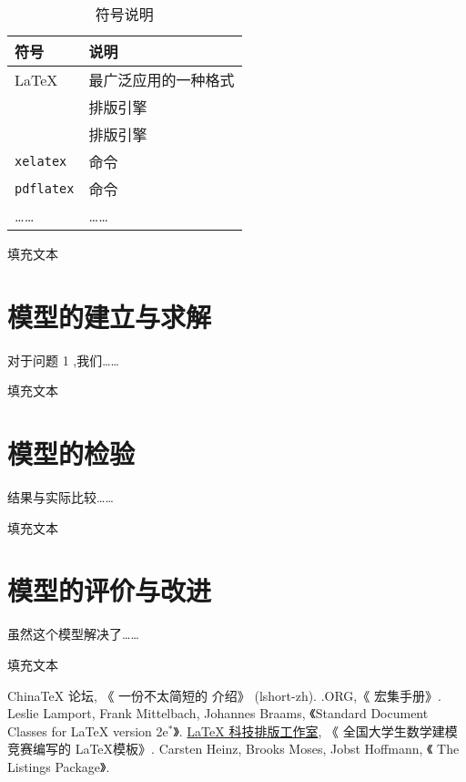 \documentclass[timesfont,no-math]{JXUSTmodeling}%
\begin{document}
	\begin{table}
		\centering
		\caption{符号说明}\label{tab:symbol}
		\begin{tabularx}{0.8\textwidth}{YY}
			\toprule
			符号		&		说明		\\
			\midrule
			\LaTeX		&	最广泛应用的一种格式	\\
			\midrule	
				&	排版引擎	\\
			\midrule		
				&	排版引擎	\\
			\midrule
			\texttt{xelatex}	&	命令		\\
			\midrule
			\texttt{pdflatex}		&		命令		\\
			\midrule
			……			&		……				\\
			\bottomrule
		\end{tabularx}
	\end{table}
	填充文本
	
	\lipsum[5-6]
	
	\section{模型的建立与求解}\label{sec:4}
	对于问题 1 ,我们……
	
	填充文本
	
	\lipsum[7-8]
	\section{模型的检验}\label{sec:5}
	结果与实际比较……
	
	填充文本
	
	\lipsum[9-10]
	
	\section{模型的评价与改进}\label{sec:6}
	虽然这个模型解决了……
	
	填充文本
	
	\lipsum[11-12]
	
	\begin{thebibliography}{99}
		 China\TeX{} 论坛, 《 一份不太简短的 \LaTeXe{} 介绍》 (lshort-zh).
		 \CTeX.ORG,《\CTeX{} 宏集手册》.
			Leslie Lamport, Frank Mittelbach, Johannes Braams, 《Standard Document 
		Classes for \LaTeX{} version 2e${}^*$》.
		 \href{www.latexstudio.net}{\LaTeX{} 科技排版工作室}, 《 全国大学生数学建模竞赛编写的 \LaTeX 模板》.
		 Carsten Heinz, Brooks Moses, Jobst Hoffmann, 《 The Listings Package》.
	\end{thebibliography}
	\appendix
	
\end{document}
